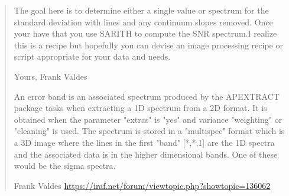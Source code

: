 \begin{quote}
The goal here is to determine either a single value or spectrum for
the standard deviation with lines and any continuum slopes
removed. Once your have that you use SARITH to compute the SNR
spectrum.I realize this is a recipe but hopefully you can devise an
image processing recipe or script appropriate for your data and
needs.

Yours, Frank Valdes 

An error band is an associated spectrum produced by the APEXTRACT
package tasks when extracting a 1D spectrum from a 2D format. It is
obtained when the parameter "extras" is "yes" and variance "weighting"
or "cleaning" is used. The spectrum is stored in a "multispec" format
which is a 3D image where the lines in the first "band" [*,*,1] are
the 1D spectra and the associated data is in the higher dimensional
bands. One of these would be the sigma spectra.

Frank Valdes \url{https://iraf.net/forum/viewtopic.php?showtopic=136062}
\end{quote}
